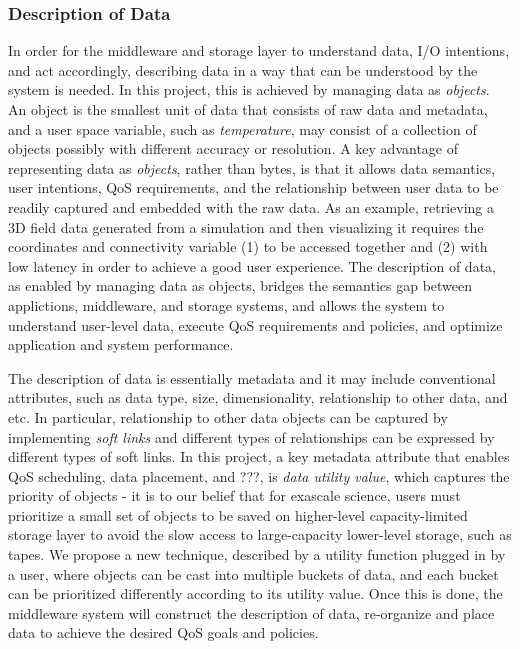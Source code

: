 \subsubsection{Description of Data}
In order for the middleware and storage layer to understand data,
I/O intentions, and act accordingly, describing data in a way that can
be understood by the system is needed. In this project, this is achieved 
by managing data as \textit{objects}.
An object is the smallest unit of data that consists of raw data and metadata,
and a user space variable, such as \textit{temperature}, may consist of a collection
of objects possibly with different accuracy or resolution.
A key advantage of representing data as \textit{objects}, rather than 
bytes, is that it allows data semantics, user intentions, QoS requirements, and
the relationship between user data to be readily captured and embedded with the 
raw data. As an example, retrieving a 3D field data generated from a simulation and then visualizing it
requires the coordinates and connectivity variable (1) to be accessed together and (2) with low
latency in order to achieve a good user experience. The description of data, 
as enabled by managing data as objects, bridges 
the semantics gap between applictions, middleware, and storage systems,
and allows the system to understand user-level data, execute QoS requirements and policies, and
optimize application and system performance.

The description of data is essentially metadata and it may include conventional attributes, such as 
data type, size, dimensionality, relationship to other data, and etc. In particular,
relationship to other data objects can be captured by implementing \textit{soft links}
and different types of relationships can be expressed by different types of soft links. 
In this project, a key metadata attribute
that enables QoS scheduling, data placement, and ???, is \textit{data utility value}, which
captures the priority of objects - it is to our belief that
for exascale science, users must prioritize a small set of objects to be saved on 
higher-level capacity-limited storage layer
to avoid the slow access to large-capacity lower-level storage, such as tapes.
We propose a new technique, described by a utility function plugged in by a user, where objects
can be cast into multiple buckets of data, and each bucket can be prioritized differently according
to its utility value.
Once this is done, the middleware system will construct the description of data, re-organize
and place data to achieve the desired QoS goals and policies.


